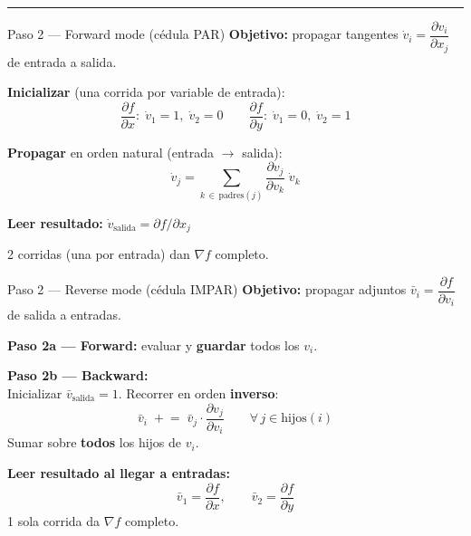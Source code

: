 \documentclass[11pt]{article}
\begin{document}
\vspace{8pt}
\hrule
\vspace{6pt}

\begin{minipage}[t]{0.475\textwidth}
\begin{graybox}{Paso 2 — Forward mode (cédula PAR)}
\small
\textbf{Objetivo:} propagar tangentes $\dot{v}_i = \dfrac{\partial v_i}{\partial x_j}$ de entrada a salida.

\vspace{4pt}
\textbf{Inicializar} (una corrida por variable de entrada):
\[
\frac{\partial f}{\partial x}:\;\dot{v}_1=1,\;\dot{v}_2=0
\qquad
\frac{\partial f}{\partial y}:\;\dot{v}_1=0,\;\dot{v}_2=1
\]

\textbf{Propagar} en orden natural (entrada $\to$ salida):
\[
\dot{v}_j = \sum_{k\,\in\,\text{padres}(j)} \frac{\partial v_j}{\partial v_k}\;\dot{v}_k
\]

\vspace{4pt}
\textbf{Leer resultado:} $\dot{v}_\text{salida} = \partial f/\partial x_j$

\vspace{3pt}
\textcolor{textgray}{\small 2 corridas (una por entrada) dan $\nabla f$ completo.}
\end{graybox}
\end{minipage}
\hfill
\begin{minipage}[t]{0.475\textwidth}
\begin{coralbox}{Paso 2 — Reverse mode (cédula IMPAR)}
\small
\textbf{Objetivo:} propagar adjuntos $\bar{v}_i = \dfrac{\partial f}{\partial v_i}$ de salida a entradas.

\vspace{4pt}
\textbf{Paso 2a — Forward:} evaluar y \textbf{guardar} todos los $v_i$.

\vspace{4pt}
\textbf{Paso 2b — Backward:}\\
Inicializar $\bar{v}_\text{salida} = 1$. Recorrer en orden \textbf{inverso}:
\[
\bar{v}_i \;\mathrel{+}=\; \bar{v}_j \cdot \frac{\partial v_j}{\partial v_i}
\qquad \forall\, j \in \text{hijos}(i)
\]
\textcolor{accentcoral}{Sumar sobre \textbf{todos} los hijos de $v_i$.}

\vspace{4pt}
\textbf{Leer resultado al llegar a entradas:}
\[
\bar{v}_1 = \frac{\partial f}{\partial x}, \qquad \bar{v}_2 = \frac{\partial f}{\partial y}
\]
\textcolor{textgray}{\small 1 sola corrida da $\nabla f$ completo.}
\end{coralbox}
\end{minipage}
\end{document}

